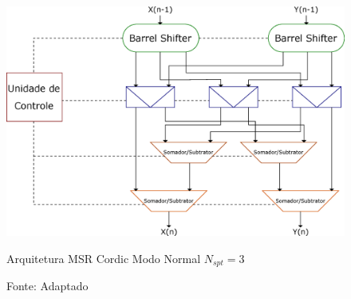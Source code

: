 \vspace{5mm}
\begin{figure}[H]
	\centering
	\captionsetup{width=0.9\textwidth, font=footnotesize, textfont=bf}	
	\includegraphics[width=0.9\linewidth]{Images/ImplementandoCordic/ArquiteturaCordicGeneralizado.eps}
	\caption{Arquitetura MSR Cordic Modo Normal $N_{spt}=3$}
	\vspace{-3.5mm}
	\caption*{Fonte: Adaptado \cite{Chih}}
	\label{fig:ArquiteturaCordicGeneralizado}
\end{figure}    
\vspace{5mm}